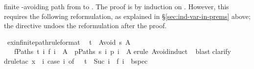 \begin{isabellebody}
\begin{isamarkuptext}
finite -avoiding path from  to .
The proof is by induction on . However,
this requires the following
reformulation, as explained in \S\ref{sec:ind-var-in-prems} above;
the  directive undoes the reformulation after the proof.%
\end{isamarkuptext}%
\isamarkuptrue%
\isamarkupfalse%
\ ex{}infinite{}path{}rule{}format{}{}\isanewline
\ \ {}t\ {}\ Avoid\ s\ A\ \ {}\isanewline
\ \ \ {}f{}Paths\ t{}\ {}{}i{}\ f\ i\ {}\ A{}\ {}\ {}{}p{}Paths\ s{}\ {}i{}\ p\ i\ {}\ A{}{}\isanewline
%
\isadelimproof
%
\endisadelimproof
%
\isatagproof
{}\isamarkupfalse%
{}erule\ Avoid{}induct{}\isanewline
\ \isamarkupfalse%
{}blast{}\isanewline
{}\isamarkupfalse%
{}clarify{}\isanewline
{}\isamarkupfalse%
{}drule{}tac\ x\ {}\ {}{}i{}\ case\ i\ of\ {}\ {}\ t\ {}\ Suc\ i\ {}\ f\ i{}\ \ bspec{}\isanewline

\end{isabellebody}
